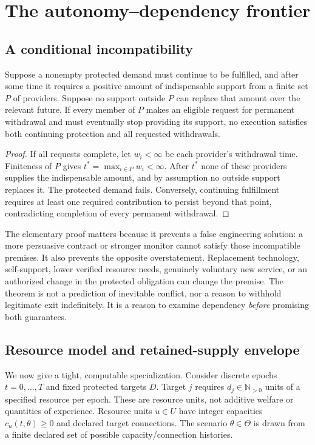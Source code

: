 \section{The autonomy--dependency frontier}
\label{sec:frontier}
\subsection{A conditional incompatibility}
\begin{theorem}
\label{thm:last}
Suppose a nonempty protected demand must continue to be fulfilled, and after some time it requires a positive amount of indispensable support from a finite set $P$ of providers. Suppose no support outside $P$ can replace that amount over the relevant future. If every member of $P$ makes an eligible request for permanent withdrawal and must eventually stop providing its support, no execution satisfies both continuing protection and all requested withdrawals.
\end{theorem}
\begin{proof}
If all requests complete, let $w_i<\infty$ be each provider's withdrawal time. Finiteness of $P$ gives $t^*=\max_{i\in P}w_i<\infty$. After $t^*$ none of these providers supplies the indispensable amount, and by assumption no outside support replaces it. The protected demand fails. Conversely, continuing fulfillment requires at least one required contribution to persist beyond that point, contradicting completion of every permanent withdrawal.
\end{proof}
The elementary proof matters because it prevents a false engineering solution: a more persuasive contract or stronger monitor cannot satisfy those incompatible premises. It also prevents the opposite overstatement. Replacement technology, self-support, lower verified resource needs, genuinely voluntary new service, or an authorized change in the protected obligation can change the premise. The theorem is not a prediction of inevitable conflict, nor a reason to withhold legitimate exit indefinitely. It is a reason to examine dependency \emph{before} promising both guarantees.

\subsection{Resource model and retained-supply envelope}
We now give a tight, computable specialization. Consider discrete epochs $t=0,\ldots,T$ and fixed protected targets $D$. Target $j$ requires $d_j\in\mathbb N_{>0}$ units of a specified resource per epoch. These are resource units, not additive welfare or quantities of experience. Resource units $u\in U$ have integer capacities $c_u(t,\theta)\geq0$ and declared target connections. The scenario $\theta\in\Theta$ is drawn from a finite declared set of possible capacity/connection histories.

